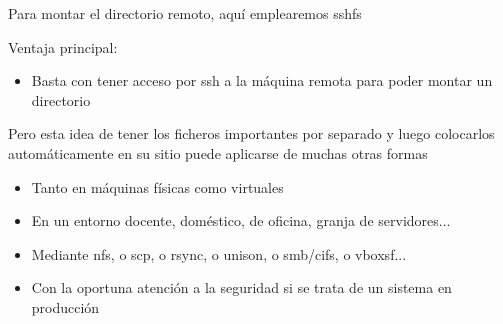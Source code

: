 \documentclass[ucs]{beamer}
\begin{document}
\begin{frame}[fragile]

Para montar el directorio remoto, aquí emplearemos sshfs

Ventaja principal:
\begin{itemize}
\item
Basta con tener acceso por ssh a la máquina remota para poder montar un directorio
\end{itemize}


Pero esta idea de tener los ficheros importantes por
separado y luego colocarlos automáticamente en su sitio puede aplicarse de muchas otras formas
\begin{itemize}
\item
Tanto en máquinas físicas como virtuales
\item
En un entorno docente, doméstico, de oficina, granja de servidores...
\item
Mediante nfs, o scp, o rsync, o unison, o smb/cifs, o vboxsf...
\item
Con la oportuna atención a la seguridad si se trata de un sistema en producción
\end{itemize}

\end{frame}
\end{document}
